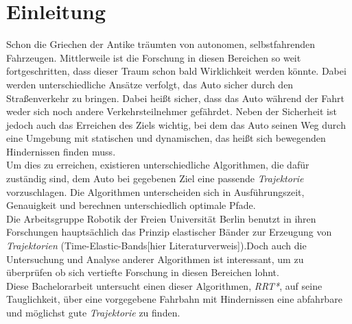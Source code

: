\section{Einleitung}
Schon die Griechen der Antike träumten von autonomen, selbstfahrenden Fahrzeugen. Mittlerweile ist die Forschung in diesen Bereichen so weit fortgeschritten, dass dieser Traum schon bald Wirklichkeit werden könnte. Dabei werden unterschiedliche Ansätze verfolgt, das Auto sicher durch den Straßenverkehr zu bringen. Dabei heißt sicher, dass das Auto während der Fahrt weder sich noch andere Verkehrsteilnehmer gefährdet. Neben der Sicherheit ist jedoch auch das Erreichen des Ziels wichtig, bei dem das Auto seinen Weg durch eine Umgebung mit statischen und dynamischen, das heißt sich bewegenden Hindernissen finden muss. \\
Um dies zu erreichen, existieren unterschiedliche Algorithmen, die dafür zuständig sind, dem Auto bei gegebenen Ziel eine passende \textit{Trajektorie} vorzuschlagen. Die Algorithmen unterscheiden sich in Ausführungszeit, Genauigkeit und berechnen unterschiedlich optimale Pfade.  \\
Die Arbeitsgruppe Robotik der Freien Universität Berlin benutzt in ihren Forschungen hauptsächlich das Prinzip elastischer Bänder zur Erzeugung von \textit{Trajektorien} (Time-Elastic-Bands[hier Literaturverweis]).Doch auch die Untersuchung und Analyse anderer Algorithmen ist interessant, um zu überprüfen ob sich vertiefte Forschung in diesen Bereichen lohnt. \\
Diese Bachelorarbeit untersucht einen dieser Algorithmen, \textit{RRT*}, auf seine Tauglichkeit, über eine vorgegebene Fahrbahn mit Hindernissen eine abfahrbare und möglichst gute \textit{Trajektorie} zu finden.

